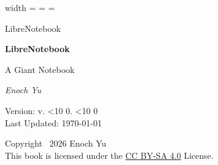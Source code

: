 \documentclass[../main.tex]{subfiles}
\begin{document}
\begingroup
\pdfximage width 
=\hbox{\pdfrefximage\pdflastximage}
\pdfpagewidth=
\pdfpageheight=
\pdfhorigin=0pt
\pdfvorigin=0pt
\shipout{}
\endgroup

\begin{titlepage}
    \thispagestyle{empty}
    \vspace*{0.1\textheight}
    \centering
    {\Huge LibreNotebook}
\end{titlepage}

\thispagestyle{empty}
\begin{titlepage}
    \centering
    \vspace*{8em}
    {
        \fontsize{35}{42}
        \selectfont\bfseries LibreNotebook \\
    }

    \vspace{0.4cm}
    {\Large A Giant Notebook\par}

    \vfill
    {\LARGE\itshape Enoch Yu\par}

    \vspace{0.8cm}
    Version: v\the\numexpr{}\relax.%
        \ifnum\month<10 0\fi\the\month.%
        \ifnum\day<10 0\fi\the\day \\
    Last Updated: \today
\end{titlepage}

\thispagestyle{empty}
\vspace*{\fill}
\begin{center}
{\small
Copyright \textcopyright\ 2026 Enoch Yu \\
This book is licensed under the
\href{https://creativecommons.org/licenses/by-sa/4.0/}{CC BY-SA 4.0}
License.
}
\end{center}

\newpage
{}
\tableofcontents
{}
\newpage
\end{document}
